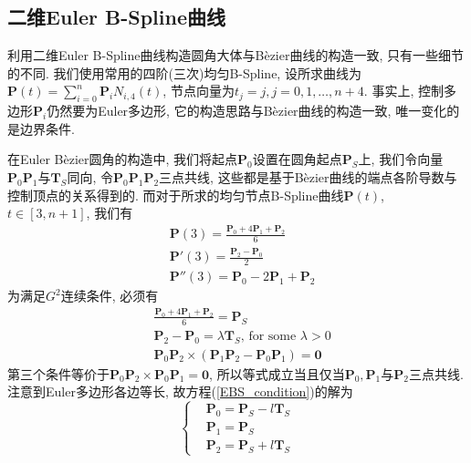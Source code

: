 \documentclass[utf8]{ctexart} %
\begin{document}
	 \subsection{二维Euler B-Spline曲线}
	 利用二维Euler B-Spline曲线构造圆角大体与B\`{e}zier曲线的构造一致, 只有一些细节的不同. 我们使用常用的四阶(三次)均匀B-Spline, 设所求曲线为$\boldsymbol{P}(t)=\sum_{i=0}^n\boldsymbol{P}_iN_{i,4}(t)$, 节点向量为$t_j = j,j=0,1,\dots,n+4$. 事实上, 控制多边形$\boldsymbol{P}_i$仍然要为Euler多边形, 它的构造思路与B\`{e}zier曲线的构造一致, 唯一变化的是边界条件.\par 
	 在Euler B\`{e}zier圆角的构造中, 我们将起点$\boldsymbol{P}_0$设置在圆角起点$\boldsymbol{P}_S$上, 我们令向量$\boldsymbol{P}_0\boldsymbol{P}_1$与$\boldsymbol{T}_S$同向, 令$\boldsymbol{P}_0$$\boldsymbol{P}_1$$\boldsymbol{P}_2$三点共线, 这些都是基于B\`{e}zier曲线的端点各阶导数与控制顶点的关系得到的. 而对于所求的均匀节点B-Spline曲线$\boldsymbol{P}(t)$, $t\in[3,n+1]$, 我们有
	 \begin{equation}
	 \begin{aligned}
	 &\boldsymbol{P}(3)=\frac{\boldsymbol{P}_0+4\boldsymbol{P}_1+\boldsymbol{P}_2}6\\
	 &\boldsymbol{P}'(3)=\frac{\boldsymbol{P}_2-\boldsymbol{P}_0}2\\
	 &\boldsymbol{P}''(3)=\boldsymbol{P}_0-2\boldsymbol{P}_1+\boldsymbol{P}_2
	 \end{aligned}
	 \end{equation}
	 为满足$G^2$连续条件, 必须有
	 \begin{equation}\label{EBS_condition}
	 \begin{aligned}
	 &\frac{\boldsymbol{P}_0+4\boldsymbol{P}_1+\boldsymbol{P}_2}6=\boldsymbol{P}_S\\
	 &\boldsymbol{P}_2-\boldsymbol{P}_0=\lambda\boldsymbol{T}_S\text{, for some }\lambda>0\\
	 &\boldsymbol{P}_0\boldsymbol{P}_2\times(\boldsymbol{P}_1\boldsymbol{P}_2-\boldsymbol{P}_0\boldsymbol{P}_1)=\boldsymbol{0}
	 \end{aligned}
	 \end{equation}
	 第三个条件等价于$\boldsymbol{P}_0\boldsymbol{P}_2\times\boldsymbol{P}_0\boldsymbol{P}_1=\boldsymbol{0}$, 所以等式成立当且仅当$\boldsymbol{P}_0,\boldsymbol{P}_1$与$\boldsymbol{P}_2$三点共线. 注意到Euler多边形各边等长,  故方程(\ref{EBS_condition})的解为
	 \begin{equation}\label{Solution}
	 \left\{
	 \begin{aligned}
	 &\boldsymbol{P}_0 = \boldsymbol{P}_S-l\boldsymbol{T}_S\\
	 &\boldsymbol{P}_1 = \boldsymbol{P}_S\\
	 &\boldsymbol{P}_2 = \boldsymbol{P}_S+l\boldsymbol{T}_S
	 \end{aligned}
	 \right.
	 \end{equation}
\end{document}
